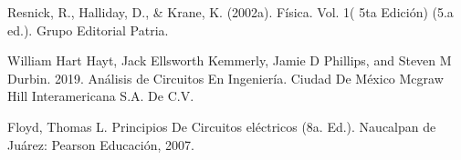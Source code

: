 \documentclass[DIV=calc, paper=a4, fontsize=11pt]{scrartcl}
\begin{document}
\begin{multicols}{2}
\begin{thebibliography}{99}
 Resnick, R., Halliday, D., & Krane, K. (2002a). Física. Vol. 1( 5ta Edición) (5.a ed.). Grupo Editorial Patria.

 William Hart Hayt, Jack Ellsworth Kemmerly, Jamie D Phillips, and Steven M Durbin. 2019. Análisis de Circuitos En Ingeniería. Ciudad De México Mcgraw Hill Interamericana S.A. De C.V.

 Floyd, Thomas L. Principios De Circuitos eléctricos (8a. Ed.). Naucalpan de Juárez: Pearson Educación, 2007.

\end{thebibliography}



\end{multicols}
\end{document}
